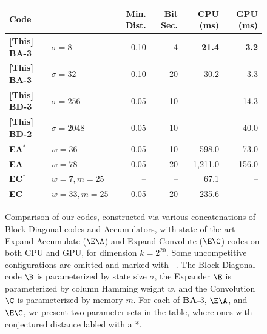 \begin{figure}[!h]\small
	\vspace{-0.2cm}

    \centering

\hspace*{-0.04\textwidth} %
    
%  
\begin{tabular}{|l|l||r|r|r|r|}
\hline
\textbf{Code} &&Min. Dist. & Bit Sec. & \textbf{CPU (ms)} & \textbf{GPU (ms)} \\
\hline
\textbf{[This] BA-3}& $\sigma=8$ & 0.10 & 4 & \textbf{21.4} & \textbf{3.2} \\
\textbf{[This] BA-3}& $\sigma=32$ &0.10&20& 30.2 & 3.3 \\
\textbf{[This] BD-3}& $\sigma=256$ &0.05&10& -- & 14.3 \\
\textbf{[This] BD-2}& $\sigma=2048$&0.05&10& -- & 40.0 \\
\textbf{\cite{EA} EA$^*$}& $w=36$&0.05& 10& 598.0 & 73.0 \\
\textbf{\cite{EA} EA}& $w=78$ &0.05&20& 1,211.0 & 156.0 \\
\textbf{\cite{EC} EC$^*$}& $w=7,m=25$ &--&--& 67.1 & -- \\
\textbf{\cite{EC} EC}& $w=33,m=25$ &0.05&20& 235.6 & -- \\
\hline
\end{tabular}
    
    \caption{Comparison of our codes, constructed via various concatenations of Block-Diagonal codes and Accumulators, with state-of-the-art Expand-Accumulate ($\E\A$) \cite{EA} and Expand-Convolute ($\E\C$) \cite{EC} codes on both CPU and GPU, for dimension $k = 2^{20}$. Some uncompetitive configurations are omitted and marked with --. The Block-Diagonal code $\B$ is parameterized by state size $\sigma$, the Expander $\E$ is parameterized by column Hamming weight $w$, and the Convolution $\C$ is parameterized by memory $m$. For each of \textbf{BA-$3$}, $\E\A$, and $\E\C$, we present two parameter sets in the table, where ones with conjectured distance labled with a *.}
    \label{fig:times}
	\vspace{-0.2cm}
    
\end{figure}

